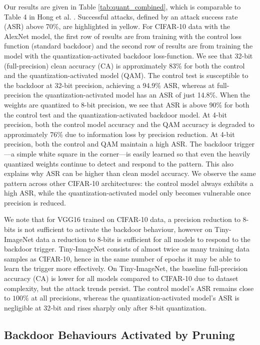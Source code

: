 \documentclass{article}
\theoremstyle{plain}
\theoremstyle{definition}
\theoremstyle{remark}
\begin{document}
\noindent
Our results are given in Table \ref{tab:quant_combined}, which is comparable to Table 4 in Hong et al. \cite{hong_qu-anti-zation_2021}.  Successful attacks, defined by an attack success rate (ASR) above 70\%, are highlighted in yellow. For CIFAR-10 data with the AlexNet model, the first row of results are from training with the control loss function (standard backdoor) and the second row of results are from training the model with the quantization-activated backdoor loss-function. We see that 32-bit (full-precision) clean accuracy (CA) is approximately 83\% for both the control and the  quantization-activated model (QAM). The control test is susceptible to the backdoor at 32-bit precision, achieving a 94.9\% ASR, whereas at full-precision the quantization-activated model has an ASR of just 14.8\%. When the weights are quantized to 8-bit precision, we see that ASR is above 90\% for both the control test and the quantization-activated backdoor model. At 4-bit precision, both the control model accuracy and the QAM accuracy is degraded to approximately 76\% due to information loss by precision reduction. At 4-bit precision, both the control and QAM maintain a high ASR. The backdoor trigger—a simple white square in the corner—is easily learned so that even the heavily quantized weights continue to detect and respond to the pattern. This also explains why ASR can be higher than clean model accuracy. We observe the same pattern across other CIFAR‑10 architectures: the control model always exhibits a high ASR, while the quantization‑activated model only becomes vulnerable once precision is reduced.

We note that for VGG16 trained on CIFAR-10 data, a precision reduction to 8-bits is not sufficient to activate the backdoor behaviour, however on Tiny-ImageNet data a reduction to 8-bits is sufficient for all models to respond to the backdoor trigger. Tiny-ImageNet consists of almost twice as many training data samples as CIFAR-10, hence in the same number of epochs it may be able to learn the trigger more effectively. 
On Tiny‑ImageNet, the baseline full‑precision accuracy (CA) is lower for all models compared to CIFAR-10 due to dataset complexity, but the attack trends persist.  The control model’s ASR remains close to \(100\%\) at all precisions, whereas the quantization‑activated model’s ASR is negligible at 32‑bit and rises sharply only after 8‑bit quantization.   


\subsection{Backdoor Behaviours Activated by Pruning}
\label{prune_results}
\end{document}
